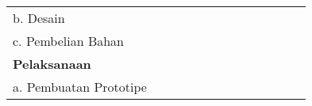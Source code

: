 \begin{longtable}{|l|cccccccccccc|}
b. Desain                                              & \multicolumn{1}{c|}{}                         & \multicolumn{1}{c|}{}                         & \multicolumn{1}{c|}{\cellcolor[HTML]{333333}} & \multicolumn{1}{c|}{\cellcolor[HTML]{333333}} & \multicolumn{1}{c|}{}                         & \multicolumn{1}{c|}{}                         & \multicolumn{1}{c|}{}                         & \multicolumn{1}{c|}{}                         & \multicolumn{1}{c|}{}                         & \multicolumn{1}{c|}{}                         & \multicolumn{1}{c|}{}                         &                          \\
c. Pembelian Bahan                                     & \multicolumn{1}{c|}{}                         & \multicolumn{1}{c|}{}                         & \multicolumn{1}{c|}{}                         & \multicolumn{1}{c|}{\cellcolor[HTML]{333333}} & \multicolumn{1}{c|}{\cellcolor[HTML]{333333}} & \multicolumn{1}{c|}{}                         & \multicolumn{1}{c|}{}                         & \multicolumn{1}{c|}{}                         & \multicolumn{1}{c|}{}                         & \multicolumn{1}{c|}{}                         & \multicolumn{1}{c|}{}                         &                          \\
\textbf{Pelaksanaan}                                            & \multicolumn{1}{c|}{}                         & \multicolumn{1}{c|}{}                         & \multicolumn{1}{c|}{}                         & \multicolumn{1}{c|}{}                         & \multicolumn{1}{c|}{}                         & \multicolumn{1}{c|}{}                         & \multicolumn{1}{c|}{}                         & \multicolumn{1}{c|}{}                         & \multicolumn{1}{c|}{}                         & \multicolumn{1}{c|}{}                         & \multicolumn{1}{c|}{}                         &                          \\
a. Pembuatan Prototipe                                 & \multicolumn{1}{c|}{}                         & \multicolumn{1}{c|}{}                         & \multicolumn{1}{c|}{}                         & \multicolumn{1}{c|}{}                         & \multicolumn{1}{c|}{}                         & \multicolumn{1}{c|}{\cellcolor[HTML]{333333}} & \multicolumn{1}{c|}{\cellcolor[HTML]{333333}} & \multicolumn{1}{c|}{}                         & \multicolumn{1}{c|}{}                         & \multicolumn{1}{c|}{}                         & \multicolumn{1}{c|}{}                         &                          \\

\end{longtable}
